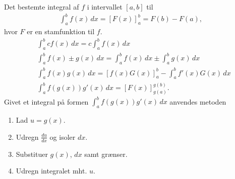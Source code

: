 Det bestemte integral af $f$ i intervallet $[a,b]$ til
\begin{align*}
\int_a^b f(x)\, dx =[F(x)]_a^b=F(b)-F(a),
\end{align*}
hvor $F$ er en stamfunktion til $f$.
\begin{align*}
&\int_a^b cf(x) \, d x=c\int_a^b f(x)\, dx\\
&\int_a^b \!\!f(x)\pm g(x) \, d x=\!\!\!\!\int_a^b\!\!f(x)\, dx\pm \!\!\!\!\int_a^b\!\! g(x) \, dx\\
&\int_a^b\!\!\!\!\! \!\!\!f(x)g(x)\, dx\!\!=\!\![f(x)G(x)]_a^b\!\!-\!\!\!\!\int_a^b\!\!\!\!\!\!\!\! f'(x)G(x)\, dx\\
&\int_a^b f(g(x))g'(x) \, dx=[F(x)]_{g(a)}^{g(b)}.
\end{align*}
Givet et integral på formen $\int_a^b f(g(x))g'(x)\, dx$ anvendes metoden
	\begin{enumerate}
	\item Lad $u=g(x)$.
	\item Udregn $\frac{du}{dx}$ og isoler $dx$.
	\item Substituer $g(x)$, $dx$ samt grænser.
	\item Udregn integralet mht. $u$.
\end{enumerate}